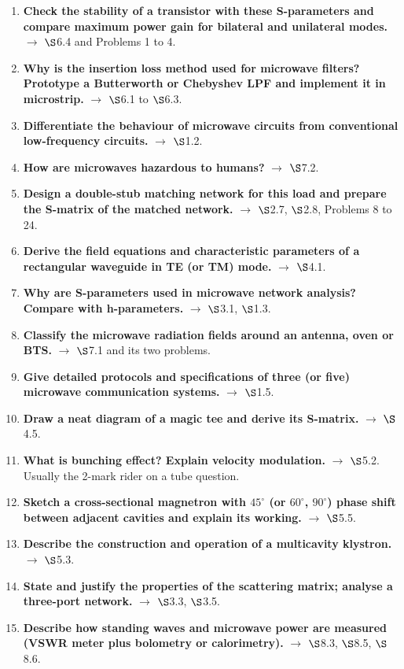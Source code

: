 \begin{enumerate}[label=\arabic*., leftmargin=1.6em, itemsep=1.5pt]
  \item \textbf{Check the stability of a transistor with these S-parameters and compare
    maximum power gain for bilateral and unilateral modes.}  $\rightarrow$
    $\S$6.4 and Problems 1 to 4.
  \item \textbf{Why is the insertion loss method used for microwave filters? Prototype a
    Butterworth or Chebyshev LPF and implement it in microstrip.} 
    $\rightarrow$ $\S$6.1 to $\S$6.3.
  \item \textbf{Differentiate the behaviour of microwave circuits from conventional
    low-frequency circuits.}  $\rightarrow$ $\S$1.2.
  \item \textbf{How are microwaves hazardous to humans?}  $\rightarrow$
    $\S$7.2.
  \item \textbf{Design a double-stub matching network for this load and prepare the S-matrix
    of the matched network.}  $\rightarrow$ $\S$2.7, $\S$2.8, Problems 8 to 24.
  \item \textbf{Derive the field equations and characteristic parameters of a rectangular
    waveguide in TE (or TM) mode.}  $\rightarrow$ $\S$4.1.
  \item \textbf{Why are S-parameters used in microwave network analysis? Compare with
    h-parameters.}  $\rightarrow$ $\S$3.1, $\S$1.3.
  \item \textbf{Classify the microwave radiation fields around an antenna, oven or BTS.}
     $\rightarrow$ $\S$7.1 and its two problems.
  \item \textbf{Give detailed protocols and specifications of three (or five) microwave
    communication systems.}  $\rightarrow$ $\S$1.5.
  \item \textbf{Draw a neat diagram of a magic tee and derive its S-matrix.}
     $\rightarrow$ $\S$4.5.
  \item \textbf{What is bunching effect? Explain velocity modulation.} 
    $\rightarrow$ $\S$5.2. Usually the 2-mark rider on a tube question.
  \item \textbf{Sketch a cross-sectional magnetron with $45^\circ$ (or $60^\circ$,
    $90^\circ$) phase shift between adjacent cavities and explain its working.}
     $\rightarrow$ $\S$5.5.
  \item \textbf{Describe the construction and operation of a multicavity klystron.}
     $\rightarrow$ $\S$5.3.
  \item \textbf{State and justify the properties of the scattering matrix; analyse a
    three-port network.}  $\rightarrow$ $\S$3.3, $\S$3.5.
  \item \textbf{Describe how standing waves and microwave power are measured (VSWR meter
    plus bolometry or calorimetry).}  $\rightarrow$ $\S$8.3, $\S$8.5, $\S$8.6.
\end{enumerate}

